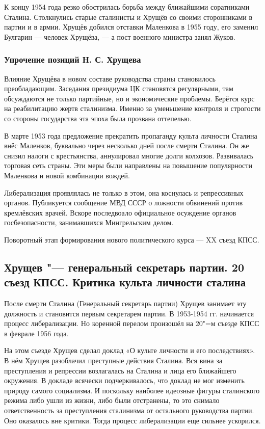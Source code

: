 К концу 1954 года резко обострилась борьба между ближайшими соратниками Сталина. Столкнулись старые сталинисты и Хрущёв со своими сторонниками в партии и в армии. Хрущёв добился отставки Маленкова в 1955 году, его заменил Булгарин --- человек Хрущёва, --- а пост военного министра занял Жуков.

\subsubsection{Упрочение позиций Н. С. Хрущева}

Влияние Хрущёва в новом составе руководства страны становилось преобладающим. Заседания президиума ЦК становятся регулярными, там обсуждаются не только партийные, но и экономические проблемы. Берётся курс на реабилитацию жертв сталинизма. Именно за уменьшение контроля и строгости со стороны государства эта эпоха была прозвана оттепелью.

В марте 1953 года предложение прекратить пропаганду культа личности Сталина внёс Маленков, буквально через несколько дней после смерти Сталина. Он же снизил налоги с крестьянства, аннулировал многие долги колхозов. Развивалась торговая сеть страны. Эти меры были направлены на повышение популярности Маленкова и новой комбинации вождей.

Либерализация проявлялась не только в этом, она коснулась и репрессивных органов. Публикуется сообщение МВД СССР о ложности обвинений против кремлёвских врачей. Вскоре последвоало официальное осуждение органов госбезопасности, занимавшихся Мингрельским делом.

Поворотный этап формирования нового политического курса --- XX съезд КПСС.

\subsection{Хрущев "--- генеральный секретарь партии. 20 съезд КПСС. Критика культа личности сталина}

После смерти Сталина (Генеральный секретарь партии) Хрущев занимает эту должность и становится первым секретарем партии.
В 1953-1954 гг. начинается процесс либерализации. Но коренной перелом произошёл на 20"=м съезде КПСС в феврале 1956 года. 

На этом съезде Хрущев сделал доклад «О культе личности и его последствиях». В нём Хрущев разоблачил преступные действия Сталина. Вся вина за преступления и репрессии возлагалась на Сталина и лица его ближайшего окружения. В докладе всячески подчеркивалось, что доклад не мог изменить природу самого социализма. И поскольку наиболее идеозные фигуры сталинского режима либо ушли из жизни, либо были отстранены, то это снимало ответственность за преступления сталинизма от остального руководства партии. Оно оказалось вне критики. Тогда процесс либерализации еще сильнее ускорился.

